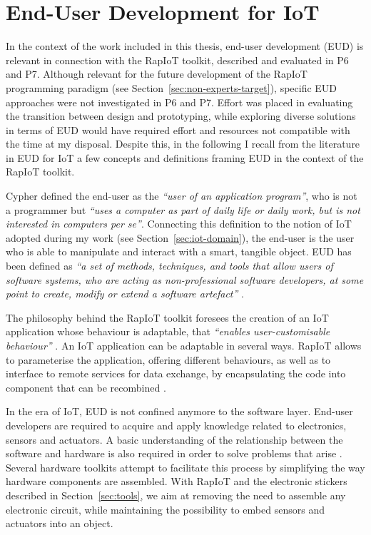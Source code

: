\section{End-User Development for IoT}

In the context of the work included in this thesis, end-user development (EUD) is relevant in connection with the RapIoT toolkit, described and evaluated in P6 and P7. Although relevant for the future development of the RapIoT programming paradigm (see Section~\ref{sec:non-experts-target}), specific EUD approaches were not investigated in P6 and P7. Effort was placed in evaluating the transition between design and prototyping, while exploring diverse solutions in terms of EUD would have required effort and resources not compatible with the time at my disposal.
Despite this, in the following I recall from the literature in EUD for IoT a few concepts and definitions framing EUD in the context of the RapIoT toolkit.

Cypher \autocite*{cypher_watch_1993} defined the end-user as the \textit{\enquote{user of an application program}}, who is not a programmer but \textit{\enquote{uses a computer as part of daily life or daily work, but is not interested in computers per se}}. Connecting this definition to the notion of IoT adopted during my work (see Section~\ref{sec:iot-domain}), the end-user is the user who is able to manipulate and interact with a smart, tangible object. EUD has been defined as \textit{\enquote{a set of methods, techniques, and tools that allow users of software systems, who are acting as non-professional software developers, at some point to create, modify or extend a software artefact}} \autocite{lieberman_end-user_2006}.

The philosophy behind the RapIoT toolkit foresees the creation of an IoT application whose behaviour is adaptable, that \textit{\enquote{enables user-customisable behaviour}} \autocite{trigg_adaptability_1987}. An IoT application can be adaptable in several ways. RapIoT allows to parameterise the application, offering different behaviours, as well as to interface to remote services for data exchange, by encapsulating the code into component that can be recombined \autocite{baldwin_design_2000}.

In the era of IoT, EUD is not confined anymore to the software layer. End-user developers are required to acquire and apply knowledge related to electronics, sensors and actuators. A basic understanding of the relationship between the software and hardware is also required in order to solve problems that arise \autocite{booth_crossed_2016}. Several hardware toolkits attempt to facilitate this process by simplifying the way hardware components are assembled. With RapIoT and the electronic stickers described in Section~\ref{sec:tools}, we aim at removing the need to assemble any electronic circuit, while maintaining the possibility to embed sensors and actuators into an object.
